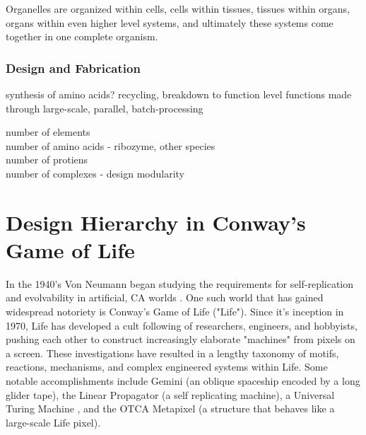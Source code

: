 {Organelles are organized within cells, cells within tissues, tissues within organs, organs within even higher level systems, and ultimately these systems come together in one complete organism.

\subsubsection{Design and Fabrication}

synthesis of amino acids? recycling, breakdown to function level
functions made through large-scale, parallel, batch-processing

number of elements\\
number of amino acids - ribozyme, other species\\
number of protiens\\
number of complexes - design modularity\\

\section{Design Hierarchy in Conway's Game of Life}

In the 1940's Von Neumann began studying the requirements for self-replication and evolvability in artificial, CA worlds \cite{Neumann1966}.  One such world that has gained widespread notoriety is Conway's Game of Life ("Life").  Since it's inception in 1970, Life has developed a cult following of researchers, engineers, and hobbyists, pushing each other to construct increasingly elaborate "machines" from pixels on a screen.  These investigations have resulted in a lengthy taxonomy of motifs, reactions, mechanisms, and complex engineered systems within Life.  Some notable accomplishments include Gemini (an oblique spaceship encoded by a long glider tape)\cite{Wade2010}, the Linear Propagator (a self replicating machine)\cite{Greene2013}, a Universal Turing Machine \cite{Rendell2000}, and the OTCA Metapixel (a structure that behaves like a large-scale Life pixel)\cite{Due2006}.\\

}
